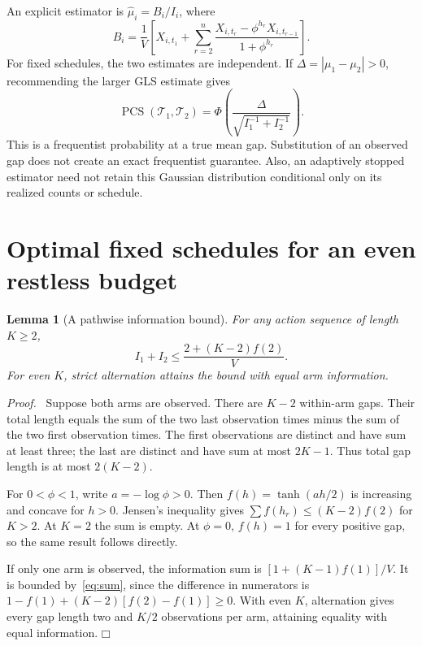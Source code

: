 \documentclass[11pt]{article}
\newtheorem{lemma}[theorem]{Lemma}
\newenvironment{proof}{\par\noindent\textit{Proof.}\ }{\hfill$\mdlgwhtsquare$\par\medskip}
\newcommand{\PCS}{\operatorname{PCS}}
\begin{document}
An explicit estimator is $\widehat\mu_i=B_i/I_i$, where
\begin{equation}
B_i=\frac1V\left[X_{i,t_1}+\sum_{r=2}^n
\frac{X_{i,t_r}-\phi^{h_r}X_{i,t_{r-1}}}{1+\phi^{h_r}}\right].
\label{eq:weighted}
\end{equation}
For fixed schedules, the two estimates are independent. If $\Delta=|\mu_1-\mu_2|>0$, recommending the larger GLS estimate gives
\begin{equation}
\PCS(\mathcal T_1,\mathcal T_2)
=\Phi\left(\frac{\Delta}{\sqrt{I_1^{-1}+I_2^{-1}}}\right).
\label{eq:frequentist}
\end{equation}
This is a frequentist probability at a true mean gap. Substitution of an observed gap does not create an exact frequentist guarantee. Also, an adaptively stopped estimator need not retain this Gaussian distribution conditional only on its realized counts or schedule.

\section{Optimal fixed schedules for an even restless budget}
\begin{lemma}[A pathwise information bound]
For any action sequence of length $K\geq2$,
\begin{equation}
I_1+I_2\leq\frac{2+(K-2)f(2)}V.
\label{eq:sum}
\end{equation}
For even $K$, strict alternation attains the bound with equal arm information.
\end{lemma}
\begin{proof}
Suppose both arms are observed. There are $K-2$ within-arm gaps. Their total length equals the sum of the two last observation times minus the sum of the two first observation times. The first observations are distinct and have sum at least three; the last are distinct and have sum at most $2K-1$. Thus total gap length is at most $2(K-2)$.

For $0<\phi<1$, write $a=-\log\phi>0$. Then $f(h)=\tanh(ah/2)$ is increasing and concave for $h>0$. Jensen's inequality gives
$\sum f(h_r)\leq(K-2)f(2)$ for $K>2$. At $K=2$ the sum is empty. At $\phi=0$, $f(h)=1$ for every positive gap, so the same result follows directly.

If only one arm is observed, the information sum is
$[1+(K-1)f(1)]/V$. It is bounded by~\eqref{eq:sum}, since the difference in numerators is
$1-f(1)+(K-2)[f(2)-f(1)]\geq0$.
With even $K$, alternation gives every gap length two and $K/2$ observations per arm, attaining equality with equal information.
\end{proof}
\end{document}
